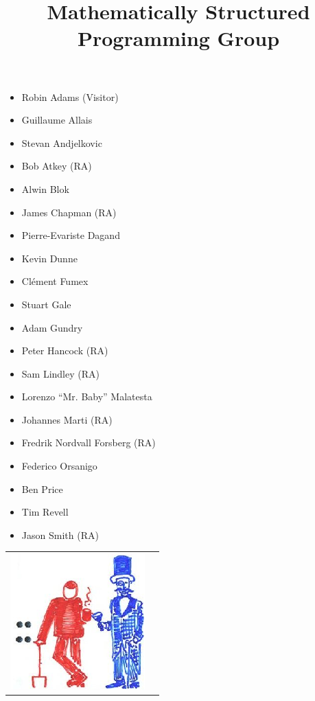 \documentclass{article}
\begin{document}
\title{\Huge \textbf{Mathematically Structured Programming Group}}

\date{}
\maketitle
\thispagestyle{empty} %

\begin{center}

\begin{multicols}{2}
\large
\begin{itemize}
  \item Robin Adams (Visitor)
  \item Guillaume Allais
  \item Stevan Andjelkovic
  \item Bob Atkey (RA)
  \item Alwin Blok
  \item James Chapman (RA)
  \item Pierre-Evariste Dagand
  \item Kevin Dunne
  \item Cl\'{e}ment Fumex
  \item Stuart Gale
  \item Adam Gundry
  \item Peter Hancock (RA)
  \item Sam Lindley (RA)
  \item Lorenzo ``Mr. Baby'' Malatesta
  \item Johannes Marti (RA)
  \item Fredrik Nordvall Forsberg (RA)
  \item Federico Orsanigo
  \item Ben Price
  \item Tim Revell
  \item Jason Smith (RA)
\end{itemize}
\end{multicols}
\vskip 3cm
\end{center}

\begin{tabular}{l r}
\hskip 1cm
\includegraphics[scale=0.65]{semicolon.png} &
\end{tabular}
\end{document}
